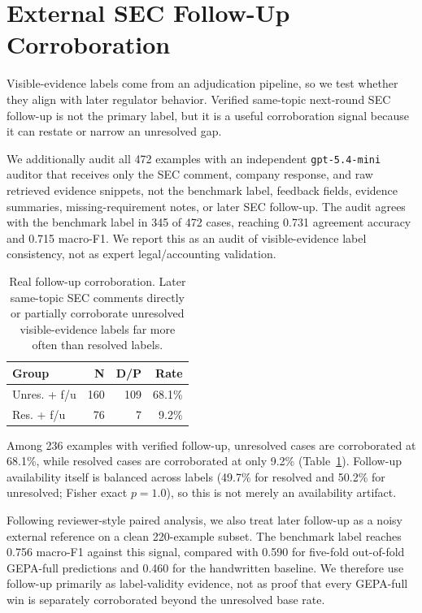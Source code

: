 \documentclass[11pt]{article}
\begin{document}
\section{External SEC Follow-Up Corroboration}

Visible-evidence labels come from an adjudication pipeline, so we test whether they align with later regulator behavior. Verified same-topic next-round SEC follow-up is not the primary label, but it is a useful corroboration signal because it can restate or narrow an unresolved gap.

We additionally audit all 472 examples with an independent \texttt{gpt-5.4-mini} auditor that receives only the SEC comment, company response, and raw retrieved evidence snippets, not the benchmark label, feedback fields, evidence summaries, missing-requirement notes, or later SEC follow-up. The audit agrees with the benchmark label in 345 of 472 cases, reaching 0.731 agreement accuracy and 0.715 macro-F1. We report this as an audit of visible-evidence label consistency, not as expert legal/accounting validation.

\begin{table}[t]
\centering
\scriptsize
\setlength{\tabcolsep}{2pt}
\begin{tabular}{lrrr}
\toprule
\textbf{Group} & \textbf{N} & \textbf{D/P} & \textbf{Rate} \\
\midrule
Unres. + f/u & 160 & 109 & 68.1\% \\
Res. + f/u & 76 & 7 & 9.2\% \\
\bottomrule
\end{tabular}
\caption{Real follow-up corroboration. Later same-topic SEC comments directly or partially corroborate unresolved visible-evidence labels far more often than resolved labels.}
\label{tab:followup}
\end{table}

Among 236 examples with verified follow-up, unresolved cases are corroborated at 68.1\%, while resolved cases are corroborated at only 9.2\% (Table~\ref{tab:followup}). Follow-up availability itself is balanced across labels (49.7\% for resolved and 50.2\% for unresolved; Fisher exact $p=1.0$), so this is not merely an availability artifact.

Following reviewer-style paired analysis, we also treat later follow-up as a noisy external reference on a clean 220-example subset. The benchmark label reaches 0.756 macro-F1 against this signal, compared with 0.590 for five-fold out-of-fold GEPA-full predictions and 0.460 for the handwritten baseline. We therefore use follow-up primarily as label-validity evidence, not as proof that every GEPA-full win is separately corroborated beyond the unresolved base rate.
\end{document}
